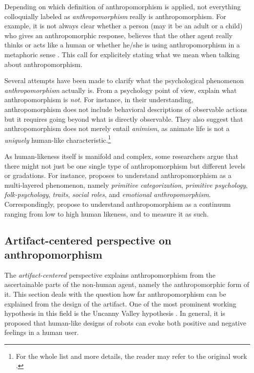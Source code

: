 \documentclass{frontiersSCNS} %
\begin{document}
Depending on which definition of anthropomorphism is applied, not everything
colloquially labeled as \emph{anthropomorphism} really is anthropomorphism.  For
example, it is not always clear whether a person (may it be an adult or a child)
who gives an anthropomorphic response, believes that the other agent really
thinks or acts like a human or whether he/she is using anthropomorphism in a
metaphoric sense \citep{leeds_childrens_1992}.  This call for explicitely
stating what we mean when talking about anthropomorphism. 

Several attempts have been made to clarify what the psychological phenomenon
\emph{anthropomorphism} actually is.  From a psychology point of view,
\citet{epley_when_2008} explain what anthropomorphism is \textit{not}. For
instance, in their understanding, anthropomorphism does not include behavioral
descriptions of observable actions but it requires going beyond what is directly
observable. They also suggest that anthropomorphism does not merely entail
\textit{animism}, as animate life is not a \textit{uniquely} human-like
characteristic.\footnote{For the whole list and more details, the reader may
refer to the original work \citep{epley_when_2008}.}

As human-likeness itself is manifold and complex, some researchers argue that
there might not just be one single type of anthropomorphism but different levels
or gradations. For instance, \citet{persson_anthropomorphism_2000} proposes to
understand anthropomorphism as a multi-layered phenomenon, namely
\emph{primitive categorization}, \emph{primitive psychology},
\emph{folk-psychology}, \emph{traits}, \emph{social roles}, and \emph{emotional
anthropomorphism}. Correspondingly, \citet{ruijten_introducing_2014} propose to
understand anthropomorphism as a continuum ranging from low to high human
likeness, and to measure it as such.

%
%
%
%
%
%


\subsection{Artifact-centered perspective on anthropomorphism}

The \emph{artifact-centered} perspective explains anthropomorphism from the
ascertainable parts of the non-human agent, namely the anthropomorphic form of
it. This section deals with the question how far anthropomorphism can be
explained from the design of the artifact.  One of the most prominent working
hypothesis in this field is the Uncanny Valley hypothesis
\citep{mori_uncanny_1970}. In general, it is proposed that human-like designs of
robots can evoke both positive and negative feelings in a human user. 
\end{document}
